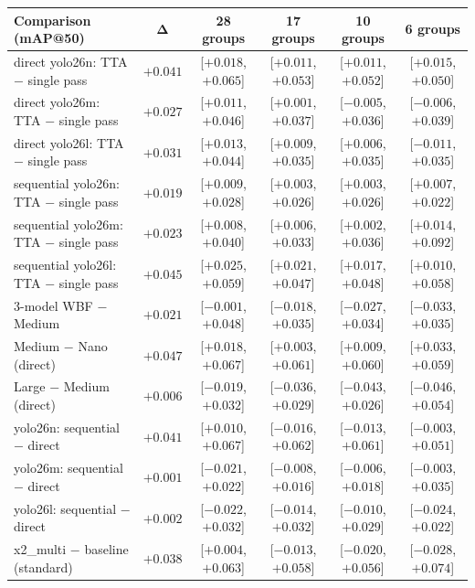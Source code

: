 \begin{tabular}{@{} l c c c c c @{}}
\toprule
\textbf{Comparison (mAP@50)} & $\boldsymbol{\Delta}$ & \textbf{28 groups} & \textbf{17 groups} & \textbf{10 groups} & \textbf{6 groups} \\
\midrule
direct yolo26n: TTA $-$ single pass & $+0.041$ & [$+0.018$, $+0.065$] & [$+0.011$, $+0.053$] & [$+0.011$, $+0.052$] & [$+0.015$, $+0.050$] \\
direct yolo26m: TTA $-$ single pass & $+0.027$ & [$+0.011$, $+0.046$] & [$+0.001$, $+0.037$] & [$-0.005$, $+0.036$] & [$-0.006$, $+0.039$] \\
direct yolo26l: TTA $-$ single pass & $+0.031$ & [$+0.013$, $+0.044$] & [$+0.009$, $+0.035$] & [$+0.006$, $+0.035$] & [$-0.011$, $+0.035$] \\
sequential yolo26n: TTA $-$ single pass & $+0.019$ & [$+0.009$, $+0.028$] & [$+0.003$, $+0.026$] & [$+0.003$, $+0.026$] & [$+0.007$, $+0.022$] \\
sequential yolo26m: TTA $-$ single pass & $+0.023$ & [$+0.008$, $+0.040$] & [$+0.006$, $+0.033$] & [$+0.002$, $+0.036$] & [$+0.014$, $+0.092$] \\
sequential yolo26l: TTA $-$ single pass & $+0.045$ & [$+0.025$, $+0.059$] & [$+0.021$, $+0.047$] & [$+0.017$, $+0.048$] & [$+0.010$, $+0.058$] \\
3-model WBF $-$ Medium & $+0.021$ & [$-0.001$, $+0.048$] & [$-0.018$, $+0.035$] & [$-0.027$, $+0.034$] & [$-0.033$, $+0.035$] \\
Medium $-$ Nano (direct) & $+0.047$ & [$+0.018$, $+0.067$] & [$+0.003$, $+0.061$] & [$+0.009$, $+0.060$] & [$+0.033$, $+0.059$] \\
Large $-$ Medium (direct) & $+0.006$ & [$-0.019$, $+0.032$] & [$-0.036$, $+0.029$] & [$-0.043$, $+0.026$] & [$-0.046$, $+0.054$] \\
yolo26n: sequential $-$ direct & $+0.041$ & [$+0.010$, $+0.067$] & [$-0.016$, $+0.062$] & [$-0.013$, $+0.061$] & [$-0.003$, $+0.051$] \\
yolo26m: sequential $-$ direct & $+0.001$ & [$-0.021$, $+0.022$] & [$-0.008$, $+0.016$] & [$-0.006$, $+0.018$] & [$-0.003$, $+0.035$] \\
yolo26l: sequential $-$ direct & $+0.002$ & [$-0.022$, $+0.032$] & [$-0.014$, $+0.032$] & [$-0.010$, $+0.029$] & [$-0.024$, $+0.022$] \\
x2\_multi $-$ baseline (standard) & $+0.038$ & [$+0.004$, $+0.063$] & [$-0.013$, $+0.058$] & [$-0.020$, $+0.056$] & [$-0.028$, $+0.074$] \\

\end{tabular}
